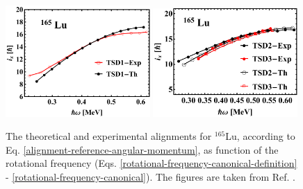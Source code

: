 \begin{figure}
    \centering
    \includegraphics[width=0.49\textwidth]{Chapters/Figures/Lu-exp-energies/fig9a_lu165.pdf}
    \includegraphics[width=0.49\textwidth]{Chapters/Figures/Lu-exp-energies/fig9b_lu165.pdf}
    \caption{The theoretical and experimental alignments for $^{165}$Lu, according to Eq. \ref{alignment-reference-angular-momentum}, as function of the rotational frequency (Eqs. \ref{rotational-frequency-canonical-definition} - \ref{rotational-frequency-canonical}). The figures are taken from Ref. \cite{raduta2020approach}.}
    \label{alignments-lu-165}
\end{figure}
